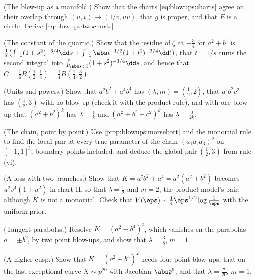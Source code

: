 \begin{refsection}
\begin{exercises}
\item \consolidation (The blow-up as a manifold.) Show that the charts \eqref{eq:blowups:charts} agree on their overlap through $(u,v)\mapsto(1/v,uv)$, that $g$ is proper, and that $E$ is a circle. Derive \eqref{eq:blowups:twocharts}.\label{ex:blowups:manifold}

\item \consolidation (The constant of the quartic.) Show that the residue of $\zeta$ at $-\frac34$ for $a^2+b^4$ is $\frac18\bigl(\int_{-1}^1(1+s^2)^{-3/4}\dd s+\int_{-1}^1\abs t^{-1/2}(1+t^2)^{-3/4}\dd t\bigr)$, that $t=1/s$ turns the second integral into $\int_{\abs s>1}(1+s^2)^{-3/4}\dd s$, and hence that $C=\frac16B(\frac12,\frac14)=\frac14B(\frac14,\frac32)$.\label{ex:blowups:constant}

\item \consolidation (Units and powers.) Show that $a^2b^2+a^4b^4$ has $(\lambda,m)=(\frac12,2)$, that $a^2b^2c^2$ has $(\frac12,3)$ with no blow-up (check it with the product rule), and with one blow-up that $(a^2+b^2)^k$ has $\lambda=\frac1k$ and $(a^2+b^2+c^2)^k$ has $\lambda=\frac3{2k}$.\label{ex:blowups:units}

\item \consolidation (The chain, point by point.) Use \cref{prop:blowups:morsebott} and the monomial rule to find the local pair at every true parameter of the chain $(a_1a_2a_3)^2$ on $[-1,1]^3$, boundary points included, and deduce the global pair $(\frac12,3)$ from rule (vi).\label{ex:blowups:chain}

\item \byhand (A loss with two branches.) Show that $K=a^2b^2+a^4=a^2(a^2+b^2)$ becomes $u^2v^4(1+u^2)$ in chart II, so that $\lambda=\frac12$ and $m=2$, the product model's pair, although $K$ is not a monomial. Check that $V(\eps)\sim\frac14\eps^{1/2}\log\frac1\eps$ with the uniform prior.\label{ex:blowups:twobranches}

\item \byhand (Tangent parabolas.) Resolve $K=(a^2-b^4)^2$, which vanishes on the parabolas $a=\pm b^2$, by two point blow-ups, and show that $\lambda=\frac38$, $m=1$. \label{ex:blowups:parabolas}

\item \byhand\hard (A higher cusp.) Show that $K=(a^2-b^5)^2$ needs four point blow-ups, that on the last exceptional curve $K\sim p^{20}$ with Jacobian $\abs p^6$, and that $\lambda=\frac7{20}$, $m=1$. \label{ex:blowups:highercusp}


\end{exercises}
\end{refsection}
